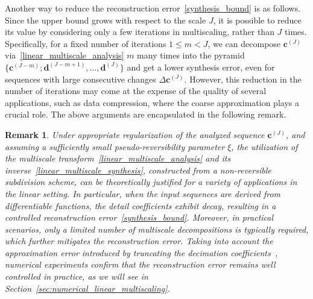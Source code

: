 \documentclass[12pt]{article}
\newtheorem{remark}{Remark}[section]
\begin{document}


Another way to reduce the reconstruction error~\eqref{synthesis_bound} is as follows. Since the upper bound grows with respect to the scale $J$, it is possible to reduce its value by considering only a few iterations in multiscaling, rather than $J$ times. Specifically, for a fixed number of iterations $1\leq m < J$, we can decompose $\boldsymbol{c}^{(J)}$ via~\eqref{linear_multiscale_analysis} $m$ many times into the pyramid $\{ \boldsymbol{c}^{(J-m)}; \boldsymbol{d}^{(J-m+1)},\dots,\boldsymbol{d}^{(J)}\}$ and get a lower synthesis error, even for sequences with large consecutive changes $\Delta\boldsymbol{c}^{(J)}$. However, this reduction in the number of iterations may come at the expense of the quality of several applications, such as data compression, where the coarse approximation plays a crucial role. The above arguments are encapsulated in the following remark.

\begin{remark}
    Under appropriate regularization of the analyzed sequence $\boldsymbol{c}^{(J)}$, and assuming a sufficiently small pseudo-reversibility parameter $\xi$, the utilization of the multiscale transform~\eqref{linear_multiscale_analysis} and its inverse~\eqref{linear_multiscale_synthesis}, constructed from a non-reversible subdivision scheme, can be theoretically justified for a variety of applications in the linear setting. In particular, when the input sequences are derived from differentiable functions, the detail coefficients exhibit decay, resulting in a controlled reconstruction error~\eqref{synthesis_bound}. Moreover, in practical scenarios, only a limited number of multiscale decompositions is typically required, which further mitigates the reconstruction error. Taking into account the approximation error introduced by truncating the decimation coefficients~\cite{mattar2023pyramid}, numerical experiments confirm that the reconstruction error remains well controlled in practice, as we will see in Section~\ref{sec:numerical_linear_multiscaling}.
\end{remark}
\end{document}
